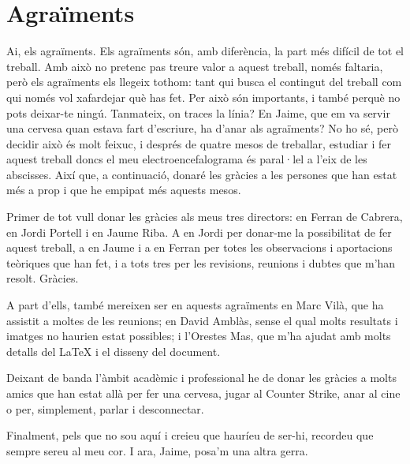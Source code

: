 \chapter*{Agraïments}
Ai, els agraïments. Els agraïments són, amb diferència, la part més difícil de tot el treball. Amb això no pretenc pas treure valor a aquest treball, només faltaria, però els agraïments els llegeix tothom: tant qui busca el contingut del treball com qui només vol xafardejar què has fet. Per això són importants, i també perquè no pots deixar-te ningú. Tanmateix, on traces la línia? En Jaime, que em va servir una cervesa quan estava fart d'escriure, ha d'anar als agraïments? No ho sé, però decidir això és molt feixuc, i després de quatre mesos de treballar, estudiar i fer aquest treball doncs el meu electroencefalograma és paral·lel a l'eix de les abscisses. Així que, a continuació, donaré les gràcies a les persones que han estat més a prop i que he empipat més aquests mesos.

Primer de tot vull donar les gràcies als meus tres directors: en Ferran de Cabrera, en Jordi Portell i en Jaume Riba. A en Jordi per donar-me la possibilitat de fer aquest treball, a en Jaume i a en Ferran per totes les observacions i aportacions teòriques que han fet, i a tots tres per les revisions, reunions i dubtes que m'han resolt. Gràcies.

A part d'ells, també mereixen ser en aquests agraïments en Marc Vilà, que ha assistit a moltes de les reunions; en David Amblàs, sense el qual molts resultats i imatges no haurien estat possibles; i l'Orestes Mas, que m'ha ajudat amb molts detalls del LaTeX i el disseny del document.

Deixant de banda l'àmbit acadèmic i professional he de donar les gràcies a molts amics que han estat allà per fer una cervesa, jugar al Counter Strike, anar al cine o per, simplement, parlar i desconnectar.

Finalment, pels que no sou aquí i creieu que hauríeu de ser-hi, recordeu que sempre sereu al meu cor. I ara, Jaime, posa'm una altra gerra.
